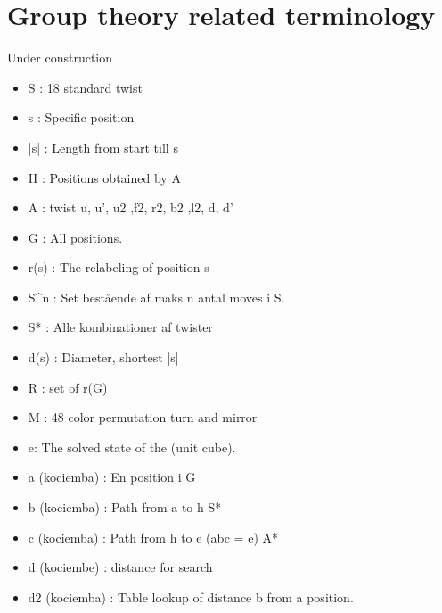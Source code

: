 \section{Group theory related terminology}
\huge{Under construction}
\begin{itemize}
\item S : 18 standard twist
\item s : Specific position
\item |s| : Length from start till s
\item H : Positions obtained by A
\item A : twist u, u', u2 ,f2, r2, b2 ,l2, d, d'
\item G : All positions. 
\item r(s) : The relabeling of position s
\item S^{n} : Set best\aa{}ende af maks n antal moves i S.
\item S* : Alle kombinationer af twister
\item d(s) : Diameter, shortest |s|
\item R : set of r(G)
\item M : 48 color permutation turn and mirror
\item e: The solved state of the \rubik{}(unit cube).

\item a (kociemba) : En position i G
\item b (kociemba) : Path from a to h S*
\item c (kociemba) : Path from h to e (abc = e) A*
\item d (kociembe) : distance for search
\item d2 (kociemba) : Table lookup of distance b from a position.

\end{itemize}




